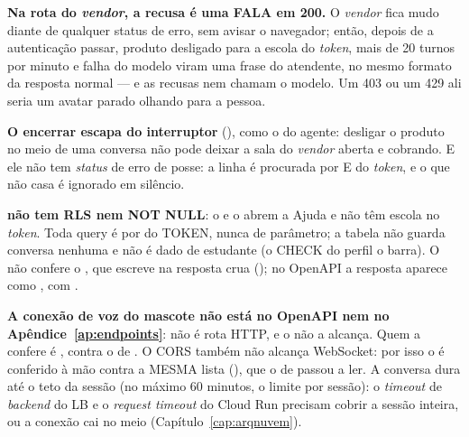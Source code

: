 \begin{regra}
\textbf{Na rota do \emph{vendor}, a recusa é uma FALA em 200.} O \emph{vendor} fica
mudo diante de qualquer status de erro, sem avisar o navegador; então, depois de
a autenticação passar, produto  desligado para a escola do
\emph{token}, mais de 20 turnos por minuto e falha do modelo viram uma frase do
atendente, no mesmo formato da resposta normal --- e as recusas nem chamam o
modelo. Um 403 ou um 429 ali seria um avatar parado olhando para a pessoa.
\end{regra}

\begin{decisao}
\textbf{O encerrar escapa do interruptor} (), como o
 do agente: desligar o produto no meio de uma conversa não pode
deixar a sala do \emph{vendor} aberta e cobrando. E ele não tem \emph{status} de
erro de posse: a linha é procurada por  E  do
\emph{token}, e o que não casa é ignorado em silêncio.
\end{decisao}

\begin{atencao}
\textbf{ não tem RLS nem  NOT NULL}: o
 e o  abrem a Ajuda e não têm escola no
\emph{token}. Toda query é por  do TOKEN, nunca de parâmetro; a
tabela não guarda conversa nenhuma e não é dado de estudante (o CHECK do perfil
o barra). O  não confere o , que
escreve na resposta crua (); no OpenAPI a resposta aparece como
, com .
\end{atencao}

\begin{atencao}
\textbf{A conexão de voz do mascote não está no OpenAPI nem no
Apêndice~\ref{ap:endpoints}}: não é rota HTTP, e o  não a
alcança. Quem a confere é , contra o
 de . O CORS também não
alcança WebSocket: por isso o  é conferido à mão contra a MESMA lista
(), que o  de  passou a
ler. A conversa dura até o teto da sessão (no máximo 60 minutos, o limite por
sessão): o \emph{timeout} de \emph{backend} do LB e o \emph{request timeout} do
Cloud Run precisam cobrir a sessão inteira, ou a conexão cai no meio
(Capítulo~\ref{cap:arqnuvem}).
\end{atencao}

